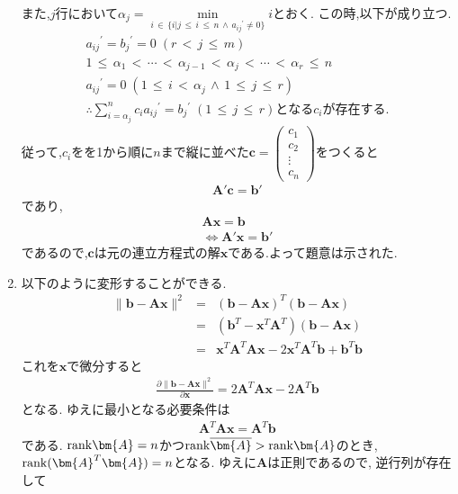 \documentclass[dvipdfmx,titlepage, 11pt, a4paper]{jsarticle}%
\begin{document}
\begin{enumerate}[(1)]
		  また,$j$行において$\alpha_j = \underset{i\, \in\, \{i |j\, \leq\, i\, \leq\, n\, \wedge\, a_{ij}{}^{'} \neq 0\}}{\min }i$とおく.
		  この時,以下が成り立つ.
		  \begin{eqnarray*}
			a_{ij}{}^{'} = b_{j}{}^{'} = 0 \; (r\, <\, j\, \leq\, m)\\
			1\,\leq\,\alpha_{1}\,<\,\cdots\,<\,\alpha_{j - 1}\, <\, \alpha_{j}\,<\,\cdots\,<\,\alpha_{r}\,\leq\,n\\
			a_{ij}{}^{'} = 0 \; (1\, \leq\, i\, <\, \alpha_j\, \wedge\, 1\, \leq\, j\, \leq\, r)\\
			\therefore \sum_{i = \alpha_j}^{n}c_{i}a_{ij}{}^{'} = b_{j}{}^{'} \; (1\, \leq\, j\, \leq\, r)となるc_{i}が存在する.
		  \end{eqnarray*}
		  従って,$c_{i}$をを1から順に$n$まで縦に並べた$\bm{c}=\begin{pmatrix}c_{1}\\c_{2}\\\vdots\\c_{n}\end{pmatrix}$をつくると
			\begin{eqnarray}
				\bm{A'c} = \bm{b'}
			\end{eqnarray}
			であり,
		  \begin{eqnarray*}
			  \bm{Ax} = \bm{b}\\
			  \Longleftrightarrow \bm{A'x} = \bm{b'}
		  \end{eqnarray*}
		  であるので,$\bm{c}$は元の連立方程式の解$\bm{x}$である.よって題意は示された.
	\item 以下のように変形することができる.
	      \begin{eqnarray*}
		      \|\bm{b}-\bm{Ax}\|^{2}&=&(\bm{b}-\bm{Ax})^{T}(\bm{b}-\bm{Ax})\\
		      &=&(\bm{b}^{T}-\bm{x}^{T}\bm{A}^{T})(\bm{b}-\bm{Ax})\\
		      &=&\bm{x}^{T}\bm{A}^{T}\bm{A}\bm{x}-2\bm{x}^{T}\bm{A}^{T}\bm{b}+\bm{b}^{T}\bm{b}
	      \end{eqnarray*}
	      これを$\bm{x}$で微分すると
	      \begin{eqnarray*}
		      \frac{\partial \|\bm{b-Ax}\|^{2}}{\partial \bm{x}} = 2\bm{A}^{T}\bm{A}\bm{x}-2\bm{A}^{T}\bm{b}
	      \end{eqnarray*}
	      となる. ゆえに最小となる必要条件は
	      \begin{eqnarray*}
		      \bm{A}^{T}\bm{A}\bm{x}=\bm{A}^{T}\bm{b}
	      \end{eqnarray*}
	      である. ${\rm rank}\bm{A}=n$かつ${\rm rank}\overline{\bm{A}}>{\rm rank}\bm{A}$のとき, ${\rm rank}(\bm{A}^{T}\bm{A})=n$となる. ゆえに$\bm{A}$は正則であるので, 逆行列が存在して

\end{enumerate}
\end{document}
